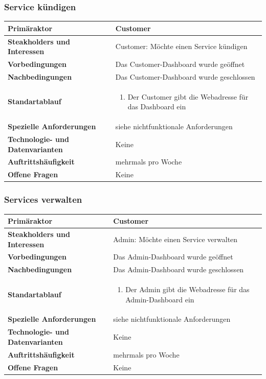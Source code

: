 \documentclass[11pt]{scrartcl}
\begin{document}
\subsubsection{Service kündigen}
\begin{longtabu} to \textwidth {X[1,l] X[2,l]}
	\bfseries Primäraktor & Customer  \\\hline 
	\bfseries Steakholders und Interessen & Customer: Möchte einen Service kündigen  \\\hline 
	\bfseries Vorbedingungen & Das Customer-Dashboard wurde geöffnet  \\\hline 
	\bfseries Nachbedingungen & Das Customer-Dashboard wurde geschlossen  \\\hline 
	\bfseries Standartablauf & 
		\begin{enumerate}
			\item Der Customer gibt die Webadresse für das Dashboard ein
			
		\end{enumerate}
      \\\hline
	\bfseries Spezielle Anforderungen & siehe nichtfunktionale Anforderungen  \\\hline 
	\bfseries Technologie- und Datenvarianten & Keine  \\\hline 
	\bfseries Auftrittshäufigkeit & mehrmals pro Woche  \\\hline 
	\bfseries Offene Fragen & Keine  \\\hline  
\end{longtabu}

\subsubsection{Services verwalten}

\begin{longtabu} to \textwidth {X[1,l] X[2,l]}
	\bfseries Primäraktor & Customer  \\\hline 
	\bfseries Steakholders und Interessen & Admin: Möchte einen Service verwalten  \\\hline 
	\bfseries Vorbedingungen & Das Admin-Dashboard wurde geöffnet  \\\hline 
	\bfseries Nachbedingungen & Das Admin-Dashboard wurde geschlossen  \\\hline 
	\bfseries Standartablauf & 
		\begin{enumerate}
			\item Der Admin gibt die Webadresse für das Admin-Dashboard ein
			
		\end{enumerate}
      \\\hline
	\bfseries Spezielle Anforderungen & siehe nichtfunktionale Anforderungen  \\\hline 
	\bfseries Technologie- und Datenvarianten & Keine  \\\hline 
	\bfseries Auftrittshäufigkeit & mehrmals pro Woche  \\\hline 
	\bfseries Offene Fragen & Keine  \\\hline  
\end{longtabu}
\end{document}
